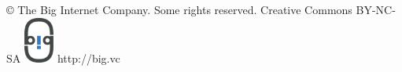 \usepackage{cclicenses}

\beamertemplatenavigationsymbolsempty

{%
\begin{beamercolorbox}{}
  \hspace{8pt} \copyright \hspace{0in} The Big Internet Company. Some rights reserved. \cc \hspace{-0.1in} Creative Commons BY-NC-SA \hfill \Huge \includegraphics[width=28pt]{./logo.pdf} \hspace{10pt}http://big.vc
  \vspace{8pt}
\end{beamercolorbox}%
}
